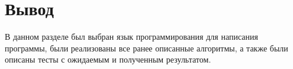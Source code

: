\section{Вывод}

В данном разделе был выбран язык программирования для написания программы, были реализованы все ранее описанные алгоритмы, а также были описаны тесты с ожидаемым и полученным результатом.